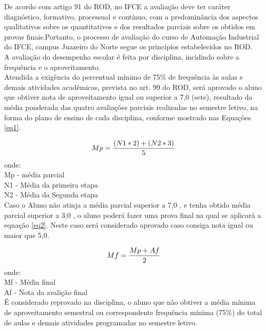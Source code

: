 De acordo com artigo 91 do ROD, no IFCE a avaliação deve ter caráter diagnóstico, formativo, processual e contínuo, com a predominância dos aspectos qualitativos sobre os quantitativos e dos resultados parciais sobre os obtidos em provas finais.Portanto, o processo de avaliação do curso de Automação Industrial do IFCE, campus Juazeiro do Norte segue os princípios estabelecidos no ROD.\\

A avaliação do desempenho escolar é feita por disciplina, incidindo sobre a frequência e o aproveitamento.\\

Atendida a exigência do percentual mínimo de 75\% de frequência às aulas e demais atividades acadêmicas, prevista no art. 99 do ROD, será aprovado o aluno que obtiver nota de aproveitamento igual ou superior a 7,0 (sete), resultado da média ponderada das quatro avaliações parciais realizadas no semestre letivo, na forma do plano de ensino de cada disciplina, conforme mostrado nas Equações \eqref{eq1}.

\begin{equation}\label{eq1}
Mp=\dfrac{(N1 * 2)+(N2 * 3)}{5}\linebreak
\end{equation}
onde:\\
Mp - média parcial\\
N1 - Média da primeira etapa\\
N2 - Média da Segunda etapa\\

Caso o Aluno não atinja a média parcial superior a 7,0 , e tenha obtido média parcial superior a 3,0 , o aluno poderá fazer uma prova final na qual se aplicará a equação \eqref{eq2}. Neste caso será considerado aprovado caso consiga nota igual ou maior que 5,0.

\begin{equation}\label{eq2}
Mf=\dfrac{Mp + Af}{2}\\
\end{equation}  
onde:\\
Mf - Média final\\
Af - Nota da avalição final\\


É considerado reprovado na disciplina, o aluno que não obtiver a média mínima de aproveitamento semestral ou correspondente frequência mínima (75\%) do total de aulas e demais atividades programadas no semestre letivo.\\

